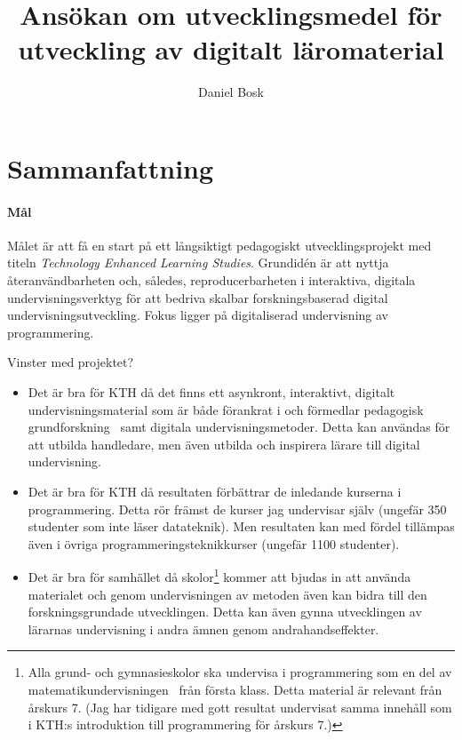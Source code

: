 \documentclass[a4paper,swedish]{article}
\title{Ansökan om utvecklingsmedel för utveckling av digitalt läromaterial}
\author{Daniel Bosk}
\affil{KTH EECS TCS, \texttt{dbosk@kth.se}}
\begin{document}
\maketitle

\section*{Sammanfattning}

\paragraph{Mål} Målet är att få en start på ett långsiktigt pedagogiskt 
utvecklingsprojekt med titeln \emph{Technology Enhanced Learning Studies}.
Grundidén är att nyttja återanvändbarheten och, således, reproducerbarheten i 
interaktiva, digitala undervisningsverktyg för att bedriva skalbar 
forskningsbaserad digital undervisningsutveckling.
Fokus ligger på digitaliserad undervisning av programmering.

Vinster med projektet?
\begin{itemize}
  \item Det är bra för KTH då det finns ett asynkront, interaktivt, digitalt 
    undervisningsmaterial som är både förankrat i och förmedlar pedagogisk 
    grundforskning~\parencite{NecessaryConditionsOfLearning} samt digitala 
    undervisningsmetoder.
    Detta kan användas för att utbilda handledare, men även utbilda och 
    inspirera lärare till digital undervisning.

  \item Det är bra för KTH då resultaten förbättrar de inledande kurserna i 
    programmering.
    Detta rör främst de kurser jag undervisar själv (ungefär 350 studenter som 
    inte läser datateknik).
    Men resultaten kan med fördel tillämpas även i övriga 
    programmeringsteknikkurser (ungefär 1100 studenter).

  \item Det är bra för samhället då skolor\footnote{%
      Alla grund- och gymnasieskolor ska undervisa i programmering som en del 
      av matematikundervisningen~\parencite{SkolverketGrProg,SkolverketGyProg} 
      från första klass.
      Detta material är relevant från årskurs 7.
      (Jag har tidigare med gott resultat undervisat samma innehåll som i KTH:s 
      introduktion till programmering för årskurs 7.)
    } kommer att bjudas in att använda materialet och genom undervisningen av 
    metoden även kan bidra till den forskningsgrundade utvecklingen.
    Detta kan även gynna utvecklingen av lärarnas undervisning i andra ämnen 
    genom andrahandseffekter.
\end{itemize}
\end{document}
